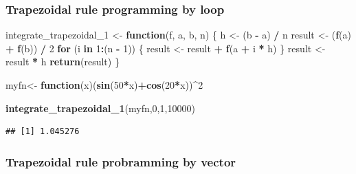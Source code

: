 \documentclass[
]{article}
\newenvironment{Shaded}{\begin{snugshade}}{\end{snugshade}}
\newcommand{\ControlFlowTok}[1]{\textcolor[rgb]{0.13,0.29,0.53}{\textbf{#1}}}
\newcommand{\DecValTok}[1]{\textcolor[rgb]{0.00,0.00,0.81}{#1}}
\newcommand{\FunctionTok}[1]{\textcolor[rgb]{0.13,0.29,0.53}{\textbf{#1}}}
\newcommand{\NormalTok}[1]{#1}
\newcommand{\OtherTok}[1]{\textcolor[rgb]{0.56,0.35,0.01}{#1}}
\newcommand{\SpecialCharTok}[1]{\textcolor[rgb]{0.81,0.36,0.00}{\textbf{#1}}}
\begin{document}
\hypertarget{trapezoidal-rule-programming-by-loop}{%
\subsubsection{Trapezoidal rule programming by
loop}\label{trapezoidal-rule-programming-by-loop}}

\begin{Shaded}
\begin{Highlighting}[]
\NormalTok{integrate\_trapezoidal\_1 }\OtherTok{\textless{}{-}} \ControlFlowTok{function}\NormalTok{(f, a, b, n) \{}
\NormalTok{  h }\OtherTok{\textless{}{-}}\NormalTok{ (b }\SpecialCharTok{{-}}\NormalTok{ a) }\SpecialCharTok{/}\NormalTok{ n}
\NormalTok{  result }\OtherTok{\textless{}{-}}\NormalTok{ (}\FunctionTok{f}\NormalTok{(a) }\SpecialCharTok{+} \FunctionTok{f}\NormalTok{(b)) }\SpecialCharTok{/} \DecValTok{2}
  \ControlFlowTok{for}\NormalTok{ (i }\ControlFlowTok{in} \DecValTok{1}\SpecialCharTok{:}\NormalTok{(n }\SpecialCharTok{{-}} \DecValTok{1}\NormalTok{)) \{}
\NormalTok{    result }\OtherTok{\textless{}{-}}\NormalTok{ result }\SpecialCharTok{+} \FunctionTok{f}\NormalTok{(a }\SpecialCharTok{+}\NormalTok{ i }\SpecialCharTok{*}\NormalTok{ h)}
\NormalTok{  \}}
\NormalTok{  result }\OtherTok{\textless{}{-}}\NormalTok{ result }\SpecialCharTok{*}\NormalTok{ h}
  \FunctionTok{return}\NormalTok{(result)}
\NormalTok{\}}

\NormalTok{myfn}\OtherTok{\textless{}{-}} \ControlFlowTok{function}\NormalTok{(x)(}\FunctionTok{sin}\NormalTok{(}\DecValTok{50}\SpecialCharTok{*}\NormalTok{x)}\SpecialCharTok{+}\FunctionTok{cos}\NormalTok{(}\DecValTok{20}\SpecialCharTok{*}\NormalTok{x))}\SpecialCharTok{\^{}}\DecValTok{2}

\FunctionTok{integrate\_trapezoidal\_1}\NormalTok{(myfn,}\DecValTok{0}\NormalTok{,}\DecValTok{1}\NormalTok{,}\DecValTok{10000}\NormalTok{) }
\end{Highlighting}
\end{Shaded}

\begin{verbatim}
## [1] 1.045276
\end{verbatim}

\hypertarget{trapezoidal-rule-probramming-by-vector}{%
\subsubsection{Trapezoidal rule probramming by
vector}\label{trapezoidal-rule-probramming-by-vector}}
\end{document}
